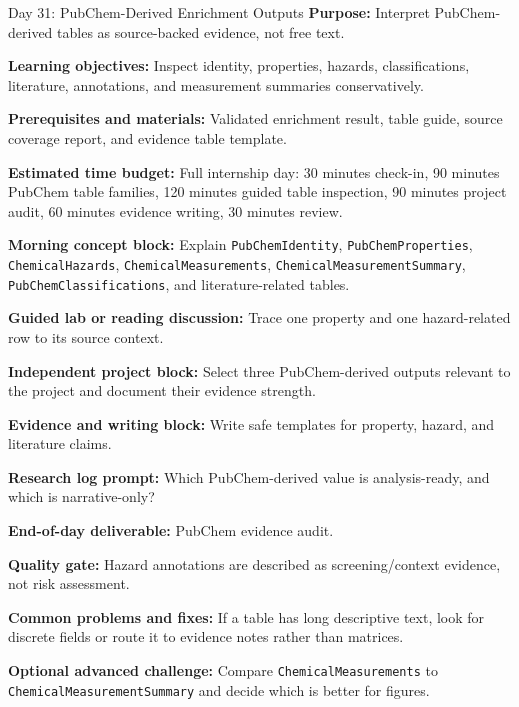 \begin{dailybox}{Day 31: PubChem-Derived Enrichment Outputs}
\textbf{Purpose:} Interpret PubChem-derived tables as source-backed evidence, not free text.

\textbf{Learning objectives:} Inspect identity, properties, hazards, classifications, literature, annotations, and measurement summaries conservatively.

\textbf{Prerequisites and materials:} Validated enrichment result, table guide, source coverage report, and evidence table template.

\textbf{Estimated time budget:} Full internship day: 30 minutes check-in, 90 minutes PubChem table families, 120 minutes guided table inspection, 90 minutes project audit, 60 minutes evidence writing, 30 minutes review.

\textbf{Morning concept block:} Explain \texttt{PubChemIdentity}, \texttt{PubChemProperties}, \texttt{ChemicalHazards}, \texttt{ChemicalMeasurements}, \texttt{ChemicalMeasurementSummary}, \texttt{PubChemClassifications}, and literature-related tables.

\textbf{Guided lab or reading discussion:} Trace one property and one hazard-related row to its source context.

\textbf{Independent project block:} Select three PubChem-derived outputs relevant to the project and document their evidence strength.

\textbf{Evidence and writing block:} Write safe templates for property, hazard, and literature claims.

\textbf{Research log prompt:} Which PubChem-derived value is analysis-ready, and which is narrative-only?

\textbf{End-of-day deliverable:} PubChem evidence audit.

\textbf{Quality gate:} Hazard annotations are described as screening/context evidence, not risk assessment.

\textbf{Common problems and fixes:} If a table has long descriptive text, look for discrete fields or route it to evidence notes rather than matrices.

\textbf{Optional advanced challenge:} Compare \texttt{ChemicalMeasurements} to \texttt{ChemicalMeasurementSummary} and decide which is better for figures.
\end{dailybox}

